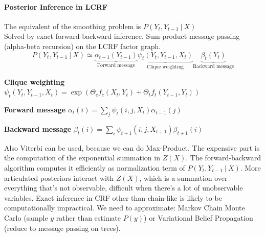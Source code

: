 \documentclass[10pt]{report}
\begin{document}
\paragraph{Posterior Inference in LCRF} The equivalent of the smoothing problem is $P(Y_t, Y_{t-1}\:|\:X)$\\
Solved by exact forward-backward inference. Sum-product message passing (alpha-beta recursion) on the LCRF factor graph.
$$P(Y_t,Y_{t-1}\:|\:X)\simeq\underset{\text{Forward message}}{\underbrace{\alpha_{t-1}(Y_{t-1})}}\underset{\text{Clique weighting}}{\underbrace{\psi_t(Y_t,Y_{t-1},X_t)}}\underset{\text{Backward message}}{\underbrace{\beta_t(Y_t)}}$$
\begin{list}{}{}
	\item \textbf{Clique weighting} $\psi_t(Y_t,Y_{t-1},X_t)=\exp(\Theta_cf_c(X_t,Y_t)+\Theta_tf_t(Y_{t-1},Y_t))$
	\item \textbf{Forward message} $\alpha_t(i) = \sum_j\psi_t(i,j,X_t)\alpha_{t-1}(j)$
	\item \textbf{Backward message} $\beta_t(i) = \sum_i\psi_{t+1}(i,j,X_{t+1})\beta_{t+1}(i)$
\end{list}
Also Viterbi can be used, because we can do Max-Product. The expensive part is the computation of the exponential summation in $Z(X)$. The forward-backward algorithm computes it efficiently as normalization term of $P(Y_t,Y_{t-1}\:|\:X)$. More articulated posteriors interact with $Z(X)$, which is a summation over everything that's not observable, difficult when there's a lot of unobservable variables. Exact inference in CRF other than chain-like is likely to be computationally impractical. We need to approximate: Markov Chain Monte Carlo (sample $y$ rather than estimate $P(y)$) or Variational Belief Propagation (reduce to message passing on trees).
\end{document}
